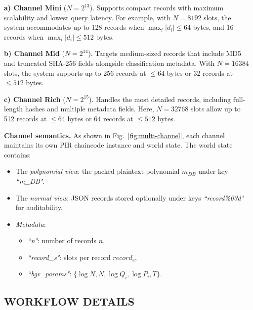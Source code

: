 \documentclass[letterpaper,journal]{IEEEtran}
\begin{document}
\textbf{a) Channel Mini} ($N=2^{13}$).  
Supports compact records with maximum scalability and lowest query latency. 
For example, with $N=8192$ slots, the system accommodates up to 128 records when $\max_i |d_i| \leq 64$ bytes, 
and 16 records when $\max_i |d_i| \leq 512$ bytes.

\textbf{b) Channel Mid} ($N=2^{14}$).
Targets medium-sized records that include MD5 and truncated SHA-256 fields alongside classification metadata. 
With $N=16384$ slots, the system supports up to 256 records at $\leq 64$ bytes or 32 records at $\leq 512$ bytes.

\textbf{c) Channel Rich} ($N=2^{15}$).
Handles the most detailed records, including full-length hashes and multiple metadata fields. 
Here, $N=32768$ slots allow up to 512 records at $\leq 64$ bytes or 64 records at $\leq 512$ bytes.

\noindent\textbf{Channel semantics.}  
As shown in Fig.~\ref{fig:multi-channel}, each channel maintains its own PIR chaincode instance and world state. 
The world state contains:
\begin{itemize}
    \item The \emph{polynomial view}: the packed plaintext polynomial \emph{$m_{DB}$} under key \emph{``m\_DB"}.
    \item The \emph{normal view}: JSON records stored optionally under keys \emph{``record\%03d"} for auditability.
    \item \emph{Metadata}: 
    \begin{itemize}
        \item \emph{``n"}: number of records $n$,
        \item \emph{``record\_s"}: slots per record $record_s$,
        \item \emph{``bgv\_params"}: $\{\log N, N, \log Q_i, \log P_i, T\}$.
    \end{itemize}
\end{itemize}

\subsection{WORKFLOW DETAILS}
\end{document}
